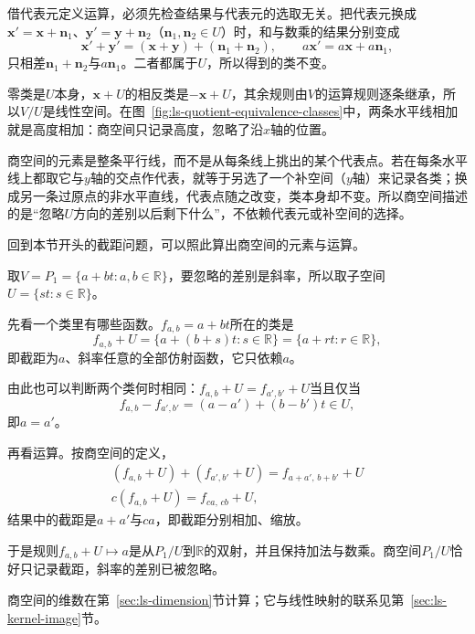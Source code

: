 借代表元定义运算，必须先检查结果与代表元的选取无关。把代表元换成$\bm x'=\bm x+\bm n_1$、$\bm y'=\bm y+\bm n_2$（$\bm n_1,\bm n_2\in U$）时，和与数乘的结果分别变成
\[
 \bm x'+\bm y'=(\bm x+\bm y)+(\bm n_1+\bm n_2),\qquad a\bm x'=a\bm x+a\bm n_1 ,
\]
只相差$\bm n_1+\bm n_2$与$a\bm n_1$。二者都属于$U$，所以得到的类不变。

零类是$U$本身，$\bm x+U$的相反类是$-\bm x+U$，其余规则由$V$的运算规则逐条继承，所以$V/U$是线性空间。在图~\ref{fig:ls-quotient-equivalence-classes}中，两条水平线相加就是高度相加：商空间只记录高度，忽略了沿$x$轴的位置。

商空间的元素是整条平行线，而不是从每条线上挑出的某个代表点。若在每条水平线上都取它与$y$轴的交点作代表，就等于另选了一个补空间（$y$轴）来记录各类；换成另一条过原点的非水平直线，代表点随之改变，类本身却不变。所以商空间描述的是“忽略$U$方向的差别以后剩下什么”，不依赖代表元或补空间的选择。

回到本节开头的截距问题，可以照此算出商空间的元素与运算。
\begin{example}[只保留截距的商空间]
\label{ex:ls-quotient-intercept}
取$V=P_1=\{a+bt:a,b\in\mathbb R\}$，要忽略的差别是斜率，所以取子空间$U=\{st:s\in\mathbb R\}$。

先看一个类里有哪些函数。$f_{a,b}=a+bt$所在的类是
\[
 f_{a,b}+U=\{a+(b+s)t:s\in\mathbb R\}=\{a+rt:r\in\mathbb R\},
\]
即截距为$a$、斜率任意的全部仿射函数，它只依赖$a$。

由此也可以判断两个类何时相同：$f_{a,b}+U=f_{a',b'}+U$当且仅当
\[
 f_{a,b}-f_{a',b'}=(a-a')+(b-b')t\in U,
\]
即$a=a'$。

再看运算。按商空间的定义，
\[
 \begin{gathered}
(f_{a,b}+U)+(f_{a',b'}+U)=f_{a+a',\,b+b'}+U\\
c(f_{a,b}+U)=f_{ca,\,cb}+U,
 \end{gathered}
\]
结果中的截距是$a+a'$与$ca$，即截距分别相加、缩放。

于是规则$f_{a,b}+U\mapsto a$是从$P_1/U$到$\mathbb R$的双射，并且保持加法与数乘。商空间$P_1/U$恰好只记录截距，斜率的差别已被忽略。
\end{example}
商空间的维数在第~\ref{sec:ls-dimension}节计算；它与线性映射的联系见第~\ref{sec:ls-kernel-image}节。
